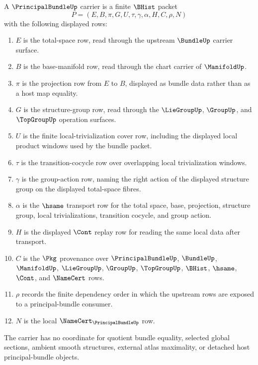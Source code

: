 \begin{definition}
\label{def:principal-bundle-carrier}
A $\PrincipalBundleUp$ carrier is a finite $\BHist$ packet
$$
P=(E,B,\pi,G,U,\tau,\gamma,\alpha,H,C,\rho,N)
$$
with the following displayed rows:
\begin{enumerate}
\item $E$ is the total-space row, read through the upstream $\BundleUp$ carrier surface.
\item $B$ is the base-manifold row, read through the chart carrier of $\ManifoldUp$.
\item $\pi$ is the projection row from $E$ to $B$, displayed as bundle data rather than as a host map equality.
\item $G$ is the structure-group row, read through the $\LieGroupUp$, $\GroupUp$, and $\TopGroupUp$ operation surfaces.
\item $U$ is the finite local-trivialization cover row, including the displayed local product windows used by the bundle packet.
\item $\tau$ is the transition-cocycle row over overlapping local trivialization windows.
\item $\gamma$ is the group-action row, naming the right action of the displayed structure group on the displayed total-space fibres.
\item $\alpha$ is the $\hsame$ transport row for the total space, base, projection, structure group, local trivializations, transition cocycle, and group action.
\item $H$ is the displayed $\Cont$ replay row for reading the same local data after transport.
\item $C$ is the $\Pkg$ provenance over $\PrincipalBundleUp$, $\BundleUp$, $\ManifoldUp$, $\LieGroupUp$, $\GroupUp$, $\TopGroupUp$, $\BHist$, $\hsame$, $\Cont$, and $\NameCert$ rows.
\item $\rho$ records the finite dependency order in which the upstream rows are exposed to a principal-bundle consumer.
\item $N$ is the local $\NameCert_{\PrincipalBundleUp}$ row.
\end{enumerate}
The carrier has no coordinate for quotient bundle equality, selected global sections, ambient smooth structures, external atlas maximality, or detached host principal-bundle objects.
\end{definition}

